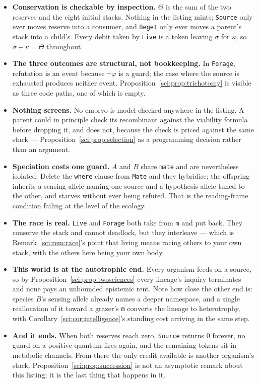 \begin{itemize}
\item \textbf{Conservation is checkable by inspection.} $\Theta$ is the sum of the two reserves and
the eight initial stacks. Nothing in the listing mints; \texttt{Source} only ever moves reserve into a
consumer, and \texttt{Beget} only ever moves a parent's stack into a child's. Every debit taken by
\texttt{Live} is a token leaving $\sigma$ for $\kappa$, so $\sigma + \kappa = \Theta$ throughout.

\item \textbf{The three outcomes are structural, not bookkeeping.} In \texttt{Forage}, refutation is
an event because $\lnot\varphi$ is a guard; the case where the source is exhausted produces neither
event. Proposition~\ref{sci:prop:trichotomy} is visible as three code paths, one of which is empty.

\item \textbf{Nothing screens.} No embryo is model-checked anywhere in the listing. A parent could
in principle check its recombinant against the viability formula before dropping it, and does not,
because the check is priced against the same stack --- Proposition~\ref{sci:prop:selection} as a
programming decision rather than an argument.

\item \textbf{Speciation costs one guard.} $A$ and $B$ share \texttt{mate} and are nevertheless
isolated. Delete the \texttt{where} clause from \texttt{Mate} and they hybridise; the offspring
inherits a sensing allele naming one source and a hypothesis allele tuned to the other, and starves
without ever being refuted. That is the reading-frame condition failing at the level of the ecology.

\item \textbf{The race is real.} \texttt{Live} and \texttt{Forage} both take from \texttt{m} and put
back. They conserve the stack and cannot deadlock, but they interleave --- which is
Remark~\ref{sci:rem:race}'s point that living means racing others to your own stack, with the others
here being your own body.

\item \textbf{This world is at the autotrophic end.} Every organism feeds on a source, so by
Proposition~\ref{sci:prop:twosciences} every lineage's inquiry terminates and none pays an unbounded
epistemic rent. Note how close the other end is: species $B$'s sensing allele already names a deeper
namespace, and a single reallocation of it toward a grazer's \texttt{m} converts the lineage to
heterotrophy, with Corollary~\ref{sci:cor:intelligence}'s standing cost arriving in the same step.

\item \textbf{And it ends.} When both reserves reach zero, \texttt{Source} returns $0$ forever, no
guard on a positive quantum fires again, and the remaining tokens sit in metabolic channels. From
there the only credit available is another organism's stack. Proposition~\ref{sci:prop:succession} is not
an asymptotic remark about this listing; it is the last thing that happens in it.
\end{itemize}

